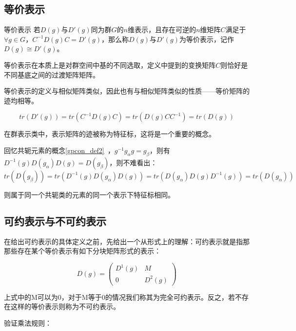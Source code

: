 


\subsection{等价表示}
\begin{definition}{等价表示}
若$D(g)$与$D'(g)$同为群$G$的$n$维表示，且存在可逆的$n$维矩阵$C$满足于$\forall g\in G$，$C^{-1}D(g)C=D'(g)$，那么称$D(g)$与$D'(g)$为等价表示，记作$D(g)\cong D'(g)$。
\end{definition}

等价表示在本质上是对群空间中基的不同选取，定义中提到的变换矩阵$C$则恰好是不同基底之间的过渡矩阵矩阵。

等价表示的定义与相似矩阵类似，因此也有与相似矩阵类似的性质——等价矩阵的迹均相等。

$$tr(D'(g))=tr(C^{-1}D(g)C)=tr(D(g)CC^{-1})=tr(D(g))$$

在群表示类中，表示矩阵的迹被称为特征标，这将是一个重要的概念。

回忆共轭元素的概念\autoref{gpcon_def2}~，$g^{-1}g_\alpha g=g_\beta$，则有$D^{-1}(g)D(g_\alpha)D(g)=D(g_\beta)$，则不难看出：
$$tr(D(g_\beta))=tr(D^{-1}(g)D(g_\alpha)D(g))=tr(D(g_\alpha)D(g)D^{-1}(g))=tr(D(g_\alpha))$$

则属于同一个共轭类的元素的同一个表示下特征标相同。


\subsection{可约表示与不可约表示}

在给出可约表示的具体定义之前，先给出一个从形式上的理解：可约表示就是指那那些存在某个等价表示有如下分块矩阵形式的表示：

\begin{equation}
D(g)=\begin{pmatrix}
 D^1(g) & M\\
 0 & D^2(g)
\end{pmatrix}
\end{equation}

上式中的M可以为0，对于M等于0的情况我们称其为完全可约表示。反之，若不存在这样的等价表示则称为不可约表示。

验证乘法规则：

